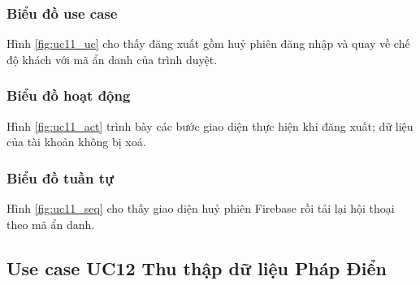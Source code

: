 \documentclass[../DoAn.tex]{subfiles}
\begin{document}
\subsubsection{Biểu đồ use case}
Hình \ref{fig:uc11_uc} cho thấy đăng xuất gồm huỷ phiên đăng nhập và quay về chế độ khách với mã ẩn danh của trình duyệt.


\subsubsection{Biểu đồ hoạt động}
Hình \ref{fig:uc11_act} trình bày các bước giao diện thực hiện khi đăng xuất; dữ liệu của tài khoản không bị xoá.


\subsubsection{Biểu đồ tuần tự}
Hình \ref{fig:uc11_seq} cho thấy giao diện huỷ phiên Firebase rồi tải lại hội thoại theo mã ẩn danh.



\subsection{Use case UC12 Thu thập dữ liệu Pháp Điển}
\label{subsection:uc12}
\end{document}
